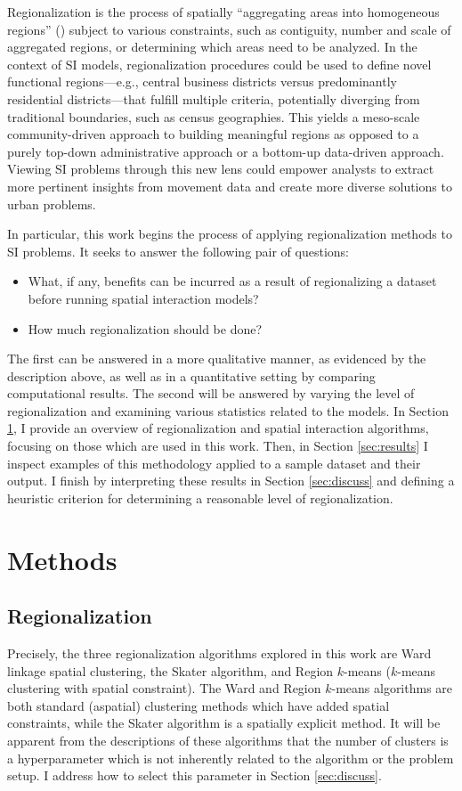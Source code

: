 \documentclass{article}
\begin{document}
    Regionalization is the process of spatially “aggregating areas into homogeneous regions” (\cite{Duque2012}) subject to various constraints, such as contiguity, number and scale of aggregated regions, or determining which areas need to be analyzed. In the context of SI models, regionalization procedures could be used to define novel functional regions---e.g., central business districts versus predominantly residential districts---that fulfill multiple criteria, potentially diverging from traditional boundaries, such as census geographies. This yields a meso-scale community-driven approach to building meaningful regions as opposed to a purely top-down administrative approach or a bottom-up data-driven approach. Viewing SI problems through this new lens could empower analysts to extract more pertinent insights from movement data and create more diverse solutions to urban problems.

    In particular, this work begins the process of applying regionalization methods to SI problems. It seeks to answer the following pair of questions: \begin{itemize}
        \item What, if any, benefits can be incurred as a result of regionalizing a dataset before running spatial interaction models?
        \item How much regionalization should be done?
    \end{itemize} The first can be answered in a more qualitative manner, as evidenced by the description above, as well as in a quantitative setting by comparing computational results. The second will be answered by varying the level of regionalization and examining various statistics related to the models. In Section \ref{sec:methods}, I provide an overview of regionalization and spatial interaction algorithms, focusing on those which are used in this work. Then, in Section \ref{sec:results} I inspect examples of this methodology applied to a sample dataset and their output. I finish by interpreting these results in Section \ref{sec:discuss} and defining a heuristic criterion for determining a reasonable level of regionalization. 

    \section{Methods} \label{sec:methods}
    \subsection{Regionalization}
    Precisely, the three regionalization algorithms explored in this work are Ward linkage spatial clustering, the Skater algorithm, and Region $k$-means ($k$-means clustering with spatial constraint). The Ward and Region $k$-means algorithms are both standard (aspatial) clustering methods which have added spatial constraints, while the Skater algorithm is a spatially explicit method. It will be apparent from the descriptions of these algorithms that the number of clusters is a hyperparameter which is not inherently related to the algorithm or the problem setup. I address how to select this parameter in Section \ref{sec:discuss}.
\end{document}
